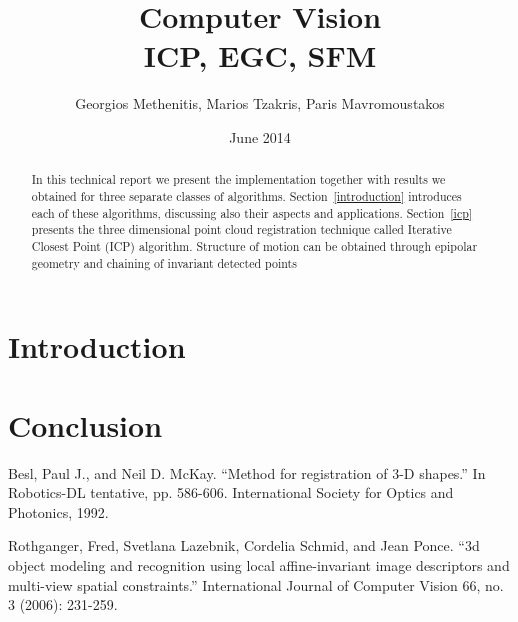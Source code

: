 \documentclass[11pt,twocolumn]{article}
\title{Computer Vision\\ICP, EGC, SFM}
\author{Georgios Methenitis, Marios Tzakris, Paris Mavromoustakos}
\affil{University of Amsterdam}
\date{June 2014}
\begin{document}
\maketitle

\renewcommand{\labelenumi}{\alph{enumi}.}


\begin{abstract}
In this technical report we present the implementation together with results we obtained for three separate classes of algorithms. Section~\ref{introduction} introduces each of these algorithms, discussing also their aspects and applications. Section~\ref{icp} presents the three dimensional point cloud registration technique called Iterative Closest Point\cite{icp} (ICP) algorithm. Structure of motion can be obtained through epipolar geometry and chaining of invariant detected points~\cite{egc}
\end{abstract}

\section{Introduction}
\label{introduction}










\section{Conclusion}
\label{conclusion}


\begin{thebibliography}{9}

Besl, Paul J., and Neil D. McKay. ``Method for registration of 3-D shapes.'' In Robotics-DL tentative, pp. 586-606. International Society for Optics and Photonics, 1992.

Rothganger, Fred, Svetlana Lazebnik, Cordelia Schmid, and Jean Ponce. ``3d object modeling and recognition using local affine-invariant image descriptors and multi-view spatial constraints.'' International Journal of Computer Vision 66, no. 3 (2006): 231-259.

\end{thebibliography}
\end{document}
